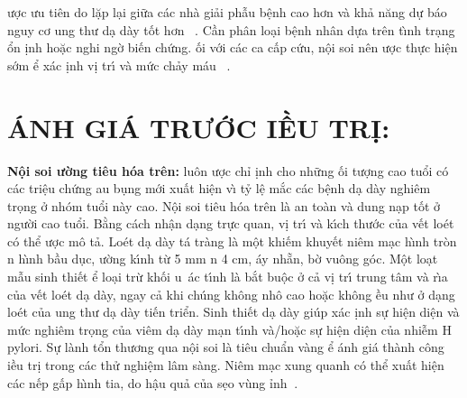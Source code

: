 \documentclass[9pt,twocolumn]{article}
\begin{document}
\text{\dj}ược ưu ti{\^{e}}n do  lặp l{\d{a}}i giữa c\'{a}c nh\`{a} giải phẫu b{\^{\d{e}}}nh cao hơn v\`{a} khả n{\u{a}}ng dự b\'{a}o nguy cơ ung thư d{\d{a}} d\`{a}y tốt hơn\unskip~\cite{2901310:34531813,2901310:34531814} . Cần ph\^{a}n lo{\d{a}}i b{\^{\d{e}}}nh nh\^{a}n dựa tr{\^{e}}n t\`{\i}nh tr{\d{a}}ng ổn \text{\dj}\d{i}nh hoặc nghi ngờ bi{{\'{\^{e}}}}n chứng. \text{\DJ}ối với c\'{a}c ca cấp cứu, n{\^{\d{o}}}i soi n{\^{e}}n \text{\dj}ược thực hi{\^{\d{e}}}n sớm \text{\dj}ể x\'{a}c \text{\dj}\d{i}nh v\d{i} tr\'{\i} v\`{a} mức  chảy m\'{a}u\unskip~\cite{2901310:34531814} .
    
\section*
  {\textbf{\text{\DJ}\'{A}NH GI\'{A} TRƯỚC \text{\DJ}IỀU TR\d{I}:}}
\textbf{N{\^{\d{o}}}i soi \text{\dj}ường ti{\^{e}}u h{\'{o}}a tr{\^{e}}n:} lu{\^o}n \text{\dj}ược chỉ \text{\dj}\d{i}nh cho những \text{\dj}ối tượng cao tuổi c{\'{o}} c\'{a}c tri{\^{\d{e}}}u chứng \text{\dj}au b\d{u}ng mới xuất hi{\^{\d{e}}}n v\`{\i} tỷ l{\^{\d{e}}} mắc c\'{a}c b{\^{\d{e}}}nh d{\d{a}} d\`{a}y nghi{\^{e}}m tr\d{o}ng ở nh{\'{o}}m tuổi n\`{a}y cao. N{\^{\d{o}}}i soi ti{\^{e}}u h{\'{o}}a tr{\^{e}}n l\`{a} an to\`{a}n v\`{a} dung n{\d{a}}p tốt ở người cao tuổi. Bằng c\'{a}ch nh{\^{\d{a}}}n d{\d{a}}ng trực quan, v\d{i} tr\'{\i} v\`{a} k\'{\i}ch thước của v{{\'{\^{e}}}}t lo{\'e}t c{\'{o}} thể \text{\dj}ược m{\^o} tả. Lo{\'e}t d{\d{a}} d\`{a}y t\'{a} tr\`{a}ng l\`{a} m{\^{\d{o}}}t khi{{\'{\^{e}}}}m khuy{{\'{\^{e}}}}t ni{\^{e}}m m{\d{a}}c h\`{\i}nh tr\`{o}n n h\`{\i}nh bầu d\d{u}c, \text{\dj}ường k\'{\i}nh từ 5 mm n 4 cm, \text{\dj}\'{a}y nhẵn, bờ vu{\^o}ng g{\'{o}}c. M{\^{\d{o}}}t lo{\d{a}}t mẫu sinh thi{{\'{\^{e}}}}t \text{\dj}ể lo{\d{a}}i trừ khối u~\'{a}c t\'{\i}nh l\`{a} bắt bu{\^{\d{o}}}c ở cả v\d{i} tr\'{\i} trung t\^{a}m v\`{a} r\`{\i}a của v{{\'{\^{e}}}}t lo{\'e}t d{\d{a}} d\`{a}y, ngay cả khi ch\'{u}ng kh{\^o}ng nh{\^o} cao hoặc kh{\^o}ng \text{\dj}ều như ở d{\d{a}}ng lo{\'e}t của ung thư d{\d{a}} d\`{a}y ti{{\'{\^{e}}}}n triển. Sinh thi{{\'{\^{e}}}}t d{\d{a}} d\`{a}y gi\'{u}p x\'{a}c \text{\dj}\d{i}nh sự hi{\^{\d{e}}}n di{\^{\d{e}}}n v\`{a} mức  nghi{\^{e}}m tr\d{o}ng của vi{\^{e}}m d{\d{a}} d\`{a}y m{\d{a}}n t\'{\i}nh v\`{a}/hoặc sự hi{\^{\d{e}}}n di{\^{\d{e}}}n của nhi{\~{\^e}}m H pylori. Sự l\`{a}nh tổn thương qua n{\^{\d{o}}}i soi l\`{a} ti{\^{e}}u chuẩn v\`{a}ng \text{\dj}ể \text{\dj}\'{a}nh gi\'{a} th\`{a}nh c{\^o}ng \text{\dj}iều tr\d{i} trong c\'{a}c thử nghi{\^{\d{e}}}m l\^{a}m s\`{a}ng. Ni{\^{e}}m m{\d{a}}c xung quanh c{\'{o}} thể xuất hi{\^{\d{e}}}n c\'{a}c n{{\'{\^{e}}}}p gấp h\`{\i}nh tia, do h{\^{\d{a}}}u quả của s\d{e}o v\`{u}ng \text{\dj}ỉnh\unskip~\cite{2901310:34531806}\ensuremath{^{}}.
\end{document}
